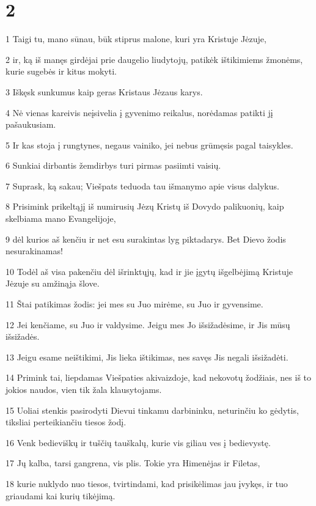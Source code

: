 \chapter{2}


\par 1 Taigi tu, mano sūnau, būk stiprus malone, kuri yra Kristuje Jėzuje, 
\par 2 ir, ką iš manęs girdėjai prie daugelio liudytojų, patikėk ištikimiems žmonėms, kurie sugebės ir kitus mokyti. 
\par 3 Iškęsk sunkumus kaip geras Kristaus Jėzaus karys. 
\par 4 Nė vienas kareivis neįsivelia į gyvenimo reikalus, norėdamas patikti jį pašaukusiam. 
\par 5 Ir kas stoja į rungtynes, negaus vainiko, jei nebus grūmęsis pagal taisykles. 
\par 6 Sunkiai dirbantis žemdirbys turi pirmas pasiimti vaisių. 
\par 7 Suprask, ką sakau; Viešpats teduoda tau išmanymo apie visus dalykus. 
\par 8 Prisimink prikeltąjį iš numirusių Jėzų Kristų iš Dovydo palikuonių, kaip skelbiama mano Evangelijoje, 
\par 9 dėl kurios aš kenčiu ir net esu surakintas lyg piktadarys. Bet Dievo žodis nesurakinamas! 
\par 10 Todėl aš visa pakenčiu dėl išrinktųjų, kad ir jie įgytų išgelbėjimą Kristuje Jėzuje su amžinąja šlove. 
\par 11 Štai patikimas žodis: jei mes su Juo mirėme, su Juo ir gyvensime. 
\par 12 Jei kenčiame, su Juo ir valdysime. Jeigu mes Jo išsižadėsime, ir Jis mūsų išsižadės. 
\par 13 Jeigu esame neištikimi, Jis lieka ištikimas, nes savęs Jis negali išsižadėti. 
\par 14 Primink tai, liepdamas Viešpaties akivaizdoje, kad nekovotų žodžiais, nes iš to jokios naudos, vien tik žala klausytojams. 
\par 15 Uoliai stenkis pasirodyti Dievui tinkamu darbininku, neturinčiu ko gėdytis, tiksliai perteikiančiu tiesos žodį. 
\par 16 Venk bedieviškų ir tuščių tauškalų, kurie vis giliau ves į bedievystę. 
\par 17 Jų kalba, tarsi gangrena, vis plis. Tokie yra Himenėjas ir Filetas, 
\par 18 kurie nuklydo nuo tiesos, tvirtindami, kad prisikėlimas jau įvykęs, ir tuo griaudami kai kurių tikėjimą. 
